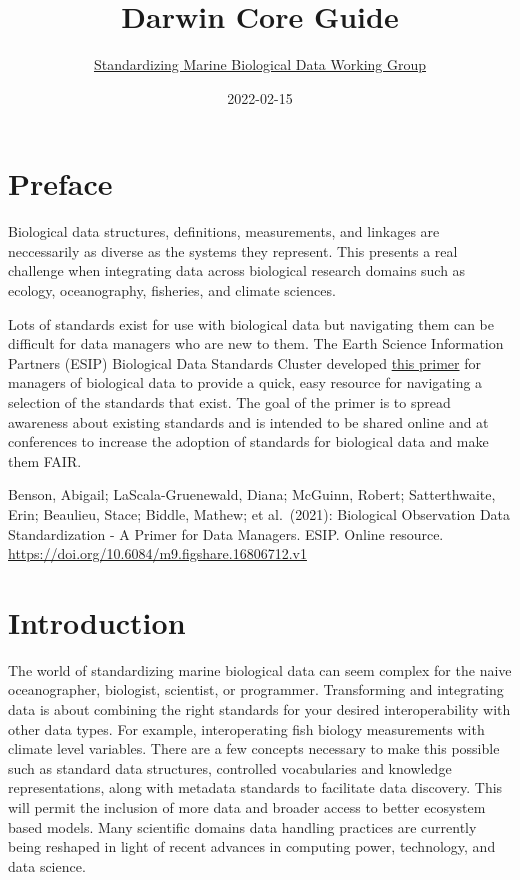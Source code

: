 \documentclass[
]{book}
\title{Darwin Core Guide}
\author{\href{https://github.com/ioos/bio_data_guide/graphs/contributors}{Standardizing Marine Biological Data Working Group}}
\date{2022-02-15}
\begin{document}
\maketitle

{
\setcounter{tocdepth}{1}
\tableofcontents
}
\hypertarget{preface}{%
\chapter*{Preface}\label{preface}}

Biological data structures, definitions, measurements, and linkages are neccessarily as diverse as the systems they represent. This presents a real challenge when integrating data across biological research domains such as ecology, oceanography, fisheries, and climate sciences.

Lots of standards exist for use with biological data but navigating them can be difficult for data managers who are new to them. The Earth Science Information Partners (ESIP) Biological Data Standards Cluster developed \href{https://doi.org/10.6084/m9.figshare.16806712.v1}{this primer} for managers of biological data to provide a quick, easy resource for navigating a selection of the standards that exist. The goal of the primer is to spread awareness about existing standards and is intended to be shared online and at conferences to increase the adoption of standards for biological data and make them FAIR.

Benson, Abigail; LaScala-Gruenewald, Diana; McGuinn, Robert; Satterthwaite, Erin; Beaulieu, Stace; Biddle, Mathew; et al.~(2021): Biological Observation Data Standardization - A Primer for Data Managers. ESIP. Online resource. \url{https://doi.org/10.6084/m9.figshare.16806712.v1}

\hypertarget{intro}{%
\chapter{Introduction}\label{intro}}

The world of standardizing marine biological data can seem complex for the naive oceanographer, biologist, scientist, or programmer.
Transforming and integrating data is about combining the right standards for your desired interoperability with other data types.
For example, interoperating fish biology measurements with climate level variables.
There are a few concepts necessary to make this possible such as standard data structures, controlled vocabularies and knowledge representations, along with metadata standards to facilitate data discovery. This will permit the inclusion of more data and broader access to better ecosystem based models. Many scientific domains data handling practices are currently being reshaped in light of recent advances in computing power, technology, and data science.
\end{document}
